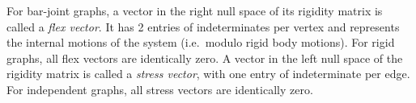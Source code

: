 For bar-joint graphs,  
a vector  in the right null space of its rigidity matrix
is called a {\em flex vector}. 
It has 2 entries of indeterminates per vertex and represents the internal motions of the system
(i.e.\ modulo rigid body motions).
For rigid graphs, all flex vectors are  identically zero. 
A vector in the left null space of the rigidity matrix
is called a {\em stress vector}, with one entry of indeterminate per edge.
For independent graphs, all stress vectors are identically zero. 












%



